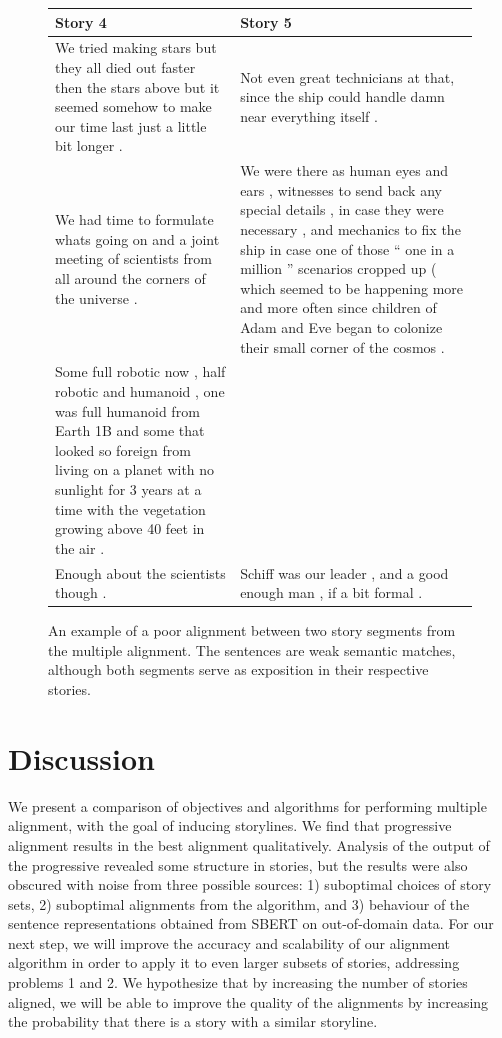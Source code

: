 \documentclass{article}
\begin{document}
\begin{figure}[h]
\centering
\small
\begin{tabular}{|p{}|p{}|}
\hline
\textbf{Story 4} & \textbf{Story 5}
\\
\hline
We tried making stars but they all died out faster then the stars above but it seemed somehow to make our time last just a little bit longer .
& Not even great technicians at that, since the ship could handle damn near everything itself .
\\
\hline
We had time to formulate whats going on and a joint meeting of scientists from all around the corners of the universe .
& We were there as human eyes and ears , witnesses to send back any special details , in case they were necessary , and mechanics to fix the ship in case one of those “ one in a million ” scenarios cropped up ( which seemed to be happening more and more often since children of Adam and Eve began to colonize their small corner of the cosmos .
\\
\hline
Some full robotic now , half robotic and humanoid , one was full humanoid from Earth 1B and some that looked so foreign from living on a planet with no sunlight for 3 years at a time with the vegetation growing above 40 feet in the air .
& \\
\hline
Enough about the scientists though .
& Schiff was our leader , and a good enough man , if a bit formal .
\\
\hline
\end{tabular}
\caption{
\label{fig:bad-alignment}
An example of a poor alignment between two story segments from the multiple alignment.
The sentences are weak semantic matches, although both segments
serve as exposition in their respective stories.
}
\end{figure}

\section{Discussion}
We present a comparison of objectives and algorithms for performing multiple alignment,
with the goal of inducing storylines.
We find that progressive alignment results in the best alignment qualitatively.
Analysis of the output of the progressive revealed some structure in stories,
but the results were also obscured with noise from three possible sources:
1) suboptimal choices of story sets, 2) suboptimal alignments from the algorithm, 
and 3) behaviour of the sentence representations obtained from SBERT on out-of-domain data.
For our next step, we will improve the accuracy and scalability of our alignment algorithm
in order to apply it to even larger subsets of stories, addressing problems 1 and 2.
We hypothesize that by increasing the number of stories aligned, we will be able to 
improve the quality of the alignments by increasing the probability that there is a story
with a similar storyline.

\newpage


\end{document}
